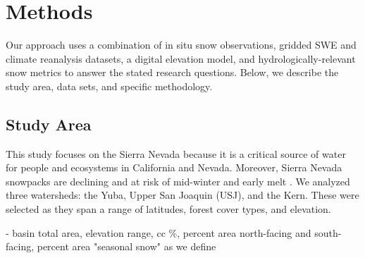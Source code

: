 \hypertarget{ch2-sa}{\section{Methods}\label{ch2-sa}}

Our approach uses a combination of in situ snow observations, gridded SWE and climate reanalysis datasets, a digital elevation model, and hydrologically-relevant snow metrics to answer the stated research questions. Below, we describe the study area, data sets, and specific methodology.

\hypertarget{ch2-sa}{\subsection{Study Area}\label{ch2-sa}}

This study focuses on the Sierra Nevada because it is a critical source of water for people and ecosystems in California and Nevada. Moreover, Sierra Nevada snowpacks are declining and at risk of mid-winter and early melt \citep{hatchettMidwinterDrySpells2023}. We analyzed three watersheds: the Yuba, Upper San Joaquin (USJ), and the Kern. These were selected as they span a range of latitudes, forest cover types, and elevation.

- basin total area, elevation range, cc \%, percent area north-facing and south-facing, percent area "seasonal snow" as we define

